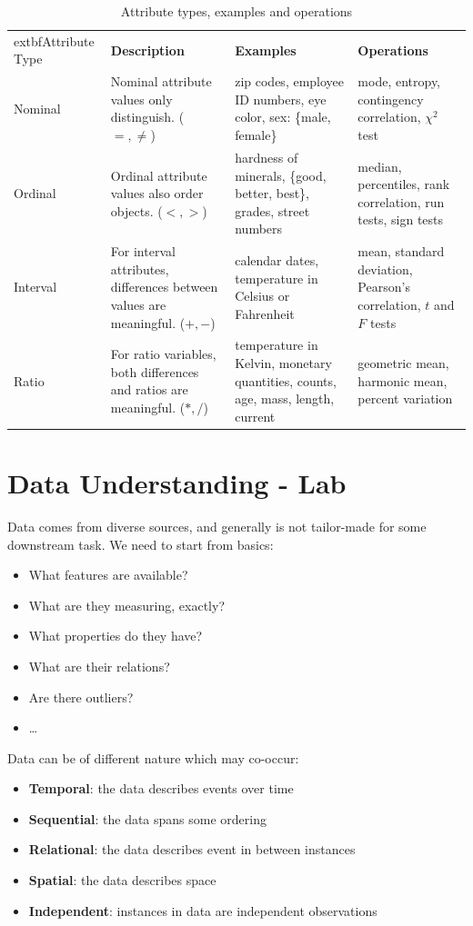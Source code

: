  \begin{table}[h!]
\centering
{}
\begin{tabular}{p{2.7cm}p{4.2cm}p{4.2cm}p{3.2cm}}
\rowcolor{cyan!30}
	extbf{Attribute Type} & \textbf{Description} & \textbf{Examples} & \textbf{Operations} \\
Nominal & Nominal attribute values only distinguish. ($=, \neq$) & zip codes, employee ID numbers, eye color, sex: \{male, female\} & mode, entropy, contingency correlation, $\chi^2$ test \\
Ordinal & Ordinal attribute values also order objects. ($<, >$) & hardness of minerals, \{good, better, best\}, grades, street numbers & median, percentiles, rank correlation, run tests, sign tests \\
Interval & For interval attributes, differences between values are meaningful. ($+, -$) & calendar dates, temperature in Celsius or Fahrenheit & mean, standard deviation, Pearson's correlation, $t$ and $F$ tests \\
Ratio & For ratio variables, both differences and ratios are meaningful. ($*, /$) & temperature in Kelvin, monetary quantities, counts, age, mass, length, current & geometric mean, harmonic mean, percent variation \\
\end{tabular}
\caption{Attribute types, examples and operations}
\end{table}

\section{Data Understanding - Lab}

Data comes from diverse sources, and generally is not tailor-made for some downstream task. We need to start from basics:
\begin{itemize}
	\item What features are available?
	\item What are they measuring, exactly?
	\item What properties do they have?
	\item What are their relations?
	\item Are there outliers?
	\item \dots
\end{itemize}

Data can be of different nature which may co-occur:
\begin{itemize}
	\item \textbf{Temporal}: the data describes events over time
	\item \textbf{Sequential}: the data spans some ordering
	\item \textbf{Relational}: the data describes event in between instances
	\item \textbf{Spatial}: the data describes space
	\item \textbf{Independent}: instances in data are independent observations
\end{itemize}

